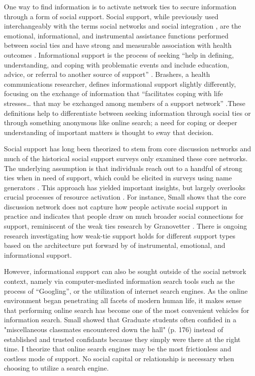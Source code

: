 One way to find information is to activate network ties to secure information
through a form of social support. Social support, while previously used
interchangeably with the terms social networks and social integration
\citep{houseStructuresProcessesSocial1988}, are the emotional, informational, and
instrumental assistance functions performed between social ties and have strong
and measurable association with health outcomes
\citep{houseMeasuresConceptsSocial1985, thoitsMechanismsLinkingSocial2011}.
Informational support is the process of seeking “help in defining,
understanding, and coping with problematic events and include education, advice,
or referral to another source of support” \citep[][p. 640]{winemiller_etal93}.
Brashers, a health communications researcher, defines informational support
slightly differently, focusing on the exchange of information that “facilitates
coping with life stresses… that may be exchanged among members of a support
network” \citet[][p. 260]{brashersInformationSeekingAvoiding2002}.These definitions
help to differentiate between seeking information through social ties or through
something anonymous like online search; a need for coping or deeper
understanding of important matters is thought to sway that decision.

Social support has long been theorized to stem from core discussion networks and
much of the historical social support surveys only examined these core
networks. The underlying assumption is that individuals reach out to a handful
of strong ties when in need of support, which could be elicited in surveys using
name generators \citep{marsdenCoreDiscussionNetworks1987}. This approach has yielded
important insights, but largely overlooks crucial
processes of resource activation \citep{hurlbertCoreNetworksTie2000,
perrySocialNetworkActivation2015, smithDonPutMy2005}. For instance, Small
\citet{smallSomeoneTalk2017} shows that the core discussion network does not capture
how people activate social support in practice and indicates that people draw on
much broader social connections for support, reminiscent of the weak ties
research by Granovetter \citet{granovetterStrengthWeakTies1973}. There is ongoing
research investigating how weak-tie support holds for different support types
based on the architecture put forward by 
\citet{houseStructuresProcessesSocial1988} of instrumental, emotional, and
informational support. 

However, informational support can also be sought outside of the social network
context, namely via computer-mediated information search tools such as the
process of “Googling”, or the utilization of internet search engines. 
As the online environment began penetrating all facets of
modern human life, it makes sense that performing online search has become one
of the most convenient vehicles for information search. Small
\citet{smallSomeoneTalk2017} showed that Graduate students often
confided in a "miscellaneous classmates encountered down the hall" (p.
176) instead of established and trusted confidants because they
simply were there at the right time. I theorize that online search engines
may be the most frictionless and costless mode of support. 
No social capital or relationship is necessary when choosing to utilize a search engine. 


